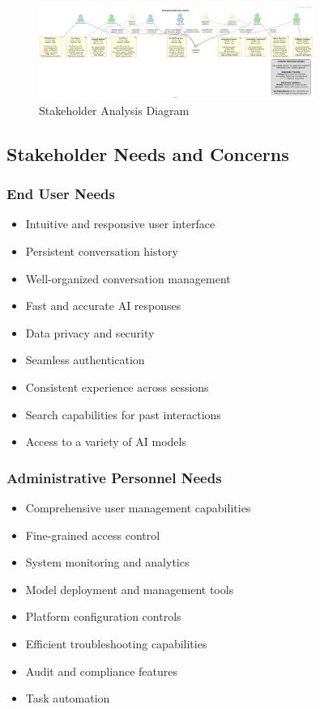 \begin{figure}
    \centering
    \includegraphics[width=0.8\textwidth]{./Chapter03/figures/Stakeholder_Analysis.png}
    \caption{Stakeholder Analysis Diagram}
    \label{fig:stakeholder-analysis}
\end{figure}

\subsection{Stakeholder Needs and Concerns}

\subsubsection*{End User Needs}
\begin{itemize}
   \item Intuitive and responsive user interface
   \item Persistent conversation history
   \item Well-organized conversation management
   \item Fast and accurate AI responses
   \item Data privacy and security
   \item Seamless authentication
   \item Consistent experience across sessions
   \item Search capabilities for past interactions
   \item Access to a variety of AI models
\end{itemize}

\subsubsection*{Administrative Personnel Needs}
\begin{itemize}
   \item Comprehensive user management capabilities
   \item Fine-grained access control
   \item System monitoring and analytics
   \item Model deployment and management tools
   \item Platform configuration controls
   \item Efficient troubleshooting capabilities
   \item Audit and compliance features
   \item Task automation
\end{itemize}

